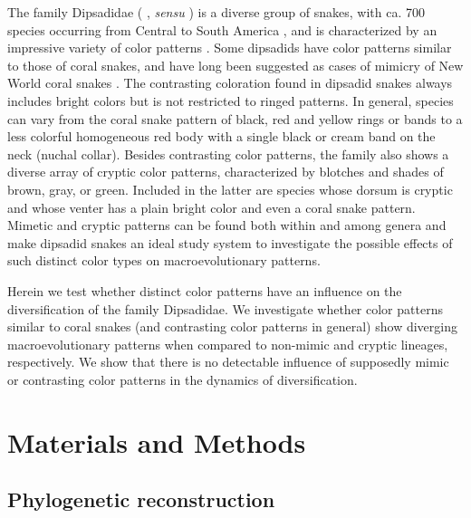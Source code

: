 The family Dipsadidae ( \citealp{zaher_2009}, \textit{sensu} \citealp{grazziotin_molecular_2012
} ) is a diverse group of snakes, with ca. 700 species occurring from Central to South America \citep{grazziotin_molecular_2012, uetz_2014}, and is characterized by an impressive variety of color patterns \citep[see][for some examples]{martins_1998}. Some dipsadids have color patterns similar to those of coral snakes, and have long been suggested as cases of mimicry of New World coral snakes \citep[family Elapidae;][]{wallace_1867, greene_coral_1981, sazima_1991, savage_1992, martins_1993, pough_1988, almeida_morphological_2014}. The contrasting coloration found in dipsadid snakes always includes bright colors but is not restricted to ringed patterns. In general, species can vary from the coral snake pattern of black, red and yellow rings or bands to a less colorful homogeneous red body with a single black or cream band on the neck (nuchal collar). Besides contrasting color patterns, the family also shows a diverse array of cryptic color patterns, characterized by blotches and shades of brown, gray, or green. Included in the latter are species whose dorsum is cryptic and whose venter has a plain bright color and even a coral snake pattern. Mimetic and cryptic patterns can be found both within and among genera and make dipsadid snakes an ideal study system to investigate the possible effects of such distinct color types on macroevolutionary patterns.

Herein we test whether distinct color patterns have an influence on the diversification of the family Dipsadidae. We investigate whether color patterns similar to coral snakes (and contrasting color patterns in general) show diverging macroevolutionary patterns when compared to non-mimic and cryptic lineages, respectively. We show that there is no detectable influence of supposedly mimic or contrasting color patterns in the dynamics of diversification.

\section{Materials and Methods}

\subsection{Phylogenetic reconstruction}

